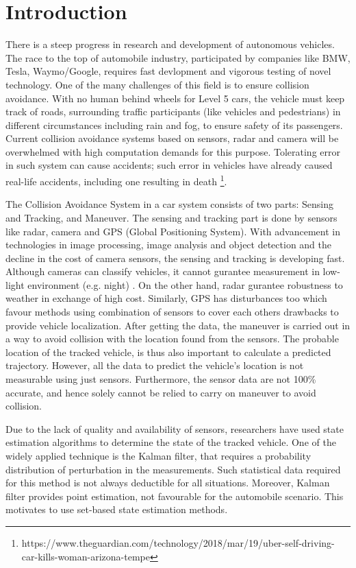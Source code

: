 \chapter{Introduction} \label{ch:intro}
There is a steep progress in research and development of autonomous vehicles. The race to the top of automobile industry, participated by companies like BMW, Tesla, Waymo/Google, requires fast devlopment and vigorous testing of novel technology. One of the many challenges of this field is to ensure collision avoidance. With no human behind wheels for Level 5 \cite{SAE2014} cars, the vehicle must keep track of roads, surrounding traffic participants (like vehicles and pedestrians) in different circumstances including rain and fog, to ensure safety of its passengers. Current collision avoidance systems based on sensors, radar and camera will be overwhelmed with high computation demands for this purpose. Tolerating error in such system can cause accidents; such error in vehicles have already caused real-life accidents, including one resulting in death \footnote{https://www.theguardian.com/technology/2018/mar/19/uber-self-driving-car-kills-woman-arizona-tempe}.


The Collision Avoidance System in a car system consists of two parts: Sensing and Tracking, and Maneuver. The sensing and tracking part is done by sensors like radar, camera and GPS (Global Positioning System). With advancement in technologies in image processing, image analysis and object detection and the decline in the cost of camera sensors, the sensing and tracking is developing fast. Although cameras can classify vehicles, it cannot gurantee measurement in low-light environment (e.g. night) \cite{Hirz2018}. On the other hand, radar gurantee robustness to weather in exchange of high cost. Similarly, GPS has disturbances too which favour methods using combination of sensors to cover each others\textquotesingle \: drawbacks to provide vehicle localization. After getting the data, the maneuver is carried out in a way to avoid collision with the location found from the sensors. The probable location of the tracked vehicle, is thus also important to calculate a predicted trajectory. However, all the data to predict the vehicle's location is not measurable using just sensors. Furthermore, the sensor data are not 100\% accurate, and hence solely cannot be relied to carry on maneuver to avoid collision.

Due to the lack of quality and availability of sensors, researchers have used state estimation algorithms to determine the state of the tracked vehicle. One of the widely applied technique is the Kalman filter, that requires a probability distribution of perturbation in the measurements. Such statistical data required for this method is not always deductible for all situations. Moreover, Kalman filter provides point estimation, not favourable for the automobile scenario. This motivates to use set-based state estimation methods.

